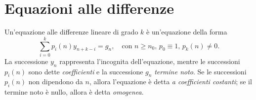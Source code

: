 \graphicspath{{./figures/capitolo2/}}
\lstset{inputpath = ./programs/capitolo2}

\chapter{Equazioni alle differenze}

Un'equazione alle differenze lineare di grado $k$ è un'equazione della forma
\begin{equation} \label{eq:equazione-alle-differenze}
\sum_{i=0}^k p_i(n) y_{n+k-i} = g_n,
\quad \text{con $n \geq n_0$, $p_0 \equiv 1$, $p_k(n) \neq 0$}.
\end{equation}
La successione $y_n$ rappresenta l'incognita dell'equazione,
mentre le successioni $p_i(n)$ sono dette \emph{coefficienti}
e la successione $g_n$ \emph{termine noto}.
Se le successioni $p_i(n)$ non dipendono da $n$, allora l'equazione
è detta \emph{a coefficienti costanti}; se il termine noto è nullo,
allora è detta \emph{omogenea}.


